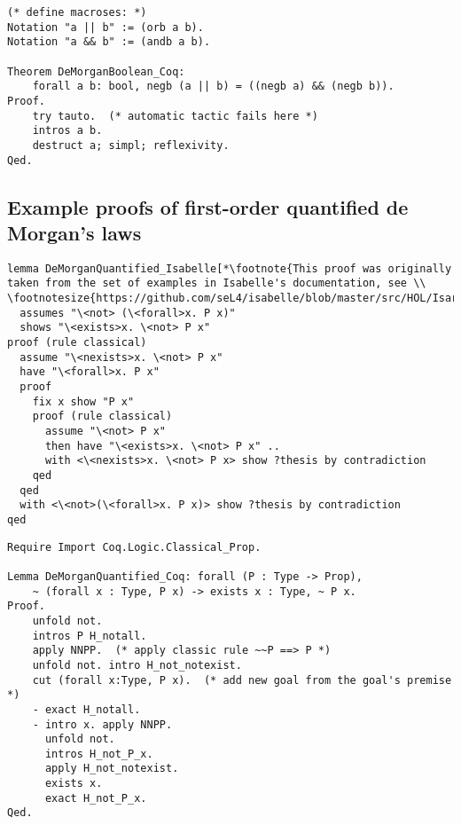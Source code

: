 \documentclass[article]{aaltoseries}
\begin{document}
\newpage
\begin{lstlisting}[language=coq,caption={Proof of the de Morgan's law for booleans in Coq}, label={ex_morgan_bool_coq}]
(* define macroses: *)
Notation "a || b" := (orb a b).
Notation "a && b" := (andb a b).

Theorem DeMorganBoolean_Coq:
    forall a b: bool, negb (a || b) = ((negb a) && (negb b)).
Proof.
    try tauto.  (* automatic tactic fails here *)
    intros a b.
    destruct a; simpl; reflexivity.
Qed.
\end{lstlisting}


\newpage
\subsection{Example proofs of first-order quantified de Morgan's laws}
\label{apx:morgan_firstorder}

\begin{lstlisting}[language=isabelle, caption={Proof of the de Morgan's law for first-order propositions in Isabelle}, label={ex_morgan_quant_isabelle}]
lemma DeMorganQuantified_Isabelle[*\footnote{This proof was originally taken from the set of examples in Isabelle's documentation, see \\ \footnotesize{https://github.com/seL4/isabelle/blob/master/src/HOL/Isar\_Examples/Drinker.thy}}*]:
  assumes "\<not> (\<forall>x. P x)"
  shows "\<exists>x. \<not> P x"
proof (rule classical)
  assume "\<nexists>x. \<not> P x"
  have "\<forall>x. P x"
  proof
    fix x show "P x"
    proof (rule classical)
      assume "\<not> P x"
      then have "\<exists>x. \<not> P x" ..
      with <\<nexists>x. \<not> P x> show ?thesis by contradiction
    qed
  qed
  with <\<not>(\<forall>x. P x)> show ?thesis by contradiction
qed
\end{lstlisting}


\begin{lstlisting}[language=coq, caption={Proof of the de Morgan's law for first-order propositions in Coq}, label={ex_morgan_quant_coq}]
Require Import Coq.Logic.Classical_Prop.

Lemma DeMorganQuantified_Coq: forall (P : Type -> Prop), 
    ~ (forall x : Type, P x) -> exists x : Type, ~ P x.
Proof.
    unfold not.
    intros P H_notall.
    apply NNPP.  (* apply classic rule ~~P ==> P *)
    unfold not. intro H_not_notexist.
    cut (forall x:Type, P x).  (* add new goal from the goal's premise *)
    - exact H_notall.
    - intro x. apply NNPP.
      unfold not.
      intros H_not_P_x.
      apply H_not_notexist.
      exists x.
      exact H_not_P_x.
Qed.
\end{lstlisting}
\end{document}
